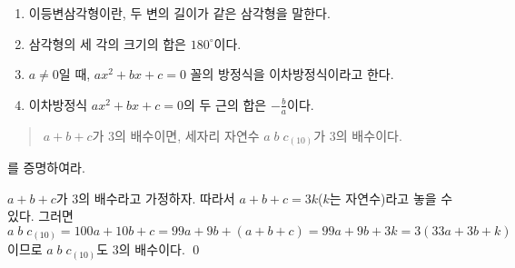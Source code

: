 \documentclass{oblivoir}
\begin{document}

%
\begin{enumerate}\label{proof1}
\item
이등변삼각형이란, 두 변의 길이가 같은 삼각형을 말한다.
\item
삼각형의 세 각의 크기의 합은 \(180^\circ\)이다.
\item
\(a\neq0\)일 때, \(ax^2+bx+c=0\) 꼴의 방정식을 이차방정식이라고 한다.
\item
이차방정식 \(ax^2+bx+c=0\)의 두 근의 합은 \(-\frac ba\)이다.
\end{enumerate}

%

%
\begin{quote}\label{proof2}
\(a+b+c\)가 \(3\)의 배수이면, 세자리 자연수 \(a\;b\;c_{(10)}\)가 \(3\)의 배수이다.\footnotemark
\end{quote}
를 증명하여라.
\begin{mdframed}
\(a+b+c\)가 \(3\)의 배수라고 가정하자.
따라서 \(a+b+c=3k\)(\(k\)는 자연수)라고 놓을 수 있다.
그러면
\[a\;b\;c_{(10)}=100a+10b+c=99a+9b+(a+b+c)=99a+9b+3k=3(33a+3b+k)\]
이므로 \(a\;b\;c_{(10)}\)도 \(3\)의 배수이다.
\qed\footnotemark

\end{mdframed}
\end{document}
